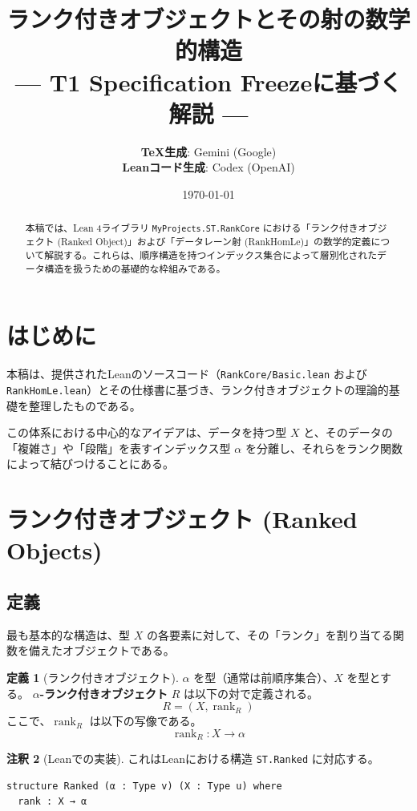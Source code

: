 \documentclass[11pt, a4paper]{article}
\title{\textbf{ランク付きオブジェクトとその射の数学的構造}\\ \large --- T1 Specification Freezeに基づく解説 ---}
\author{
  \textbf{TeX生成}: Gemini (Google) \\
  \textbf{Leanコード生成}: Codex (OpenAI)
}
\date{\today}
\theoremstyle{definition}
\newtheorem{definition}{定義}[section]
\newtheorem{remark}[definition]{注釈}
\newcommand{\code}[1]{\texttt{#1}}
\newcommand{\rank}{\operatorname{rank}}
\begin{document}
\maketitle

\begin{abstract}
本稿では、Lean 4ライブラリ \code{MyProjects.ST.RankCore} における「ランク付きオブジェクト (Ranked Object)」および「データレーン射 (RankHomLe)」の数学的定義について解説する。これらは、順序構造を持つインデックス集合によって層別化されたデータ構造を扱うための基礎的な枠組みである。
\end{abstract}

\tableofcontents

\section{はじめに}
本稿は、提供されたLeanのソースコード（\code{RankCore/Basic.lean} および \code{RankHomLe.lean}）とその仕様書に基づき、ランク付きオブジェクトの理論的基礎を整理したものである。

この体系における中心的なアイデアは、データを持つ型 $X$ と、そのデータの「複雑さ」や「段階」を表すインデックス型 $\alpha$ を分離し、それらをランク関数によって結びつけることにある。

\section{ランク付きオブジェクト (Ranked Objects)}
\label{sec:ranked}

\subsection{定義}
最も基本的な構造は、型 $X$ の各要素に対して、その「ランク」を割り当てる関数を備えたオブジェクトである。

\begin{definition}[ランク付きオブジェクト]
$\alpha$ を型（通常は前順序集合）、$X$ を型とする。
\textbf{$\alpha$-ランク付きオブジェクト} $R$ は以下の対で定義される。
\[
  R = (X, \rank_R)
\]
ここで、$\rank_R$ は以下の写像である。
\[
  \rank_R : X \to \alpha
\]
\end{definition}

\begin{remark}[Leanでの実装]
これはLeanにおける構造 \code{ST.Ranked} に対応する。
\begin{verbatim}
structure Ranked (α : Type v) (X : Type u) where
  rank : X → α
\end{verbatim}
\end{remark}
\end{document}
